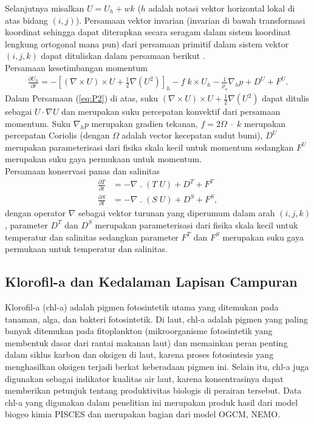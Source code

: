 \begin{spacing}{1.5}
	Selanjutnya misalkan $U = U_h + wk$ ($h$ adalah notasi vektor horizontal lokal di atas bidang $(i,j)$). Persamaan vektor invarian (invarian di bawah transformasi koordinat sehingga dapat diterapkan secara seragam dalam sistem koordinat lengkung ortogonal mana pun) dari persamaan primitif dalam sistem vektor $(i, j, k)$ dapat dituliskan dalam persamaan berikut .\\
	Persamaan kesetimbangan momentum
	\begin{equation}\label{eq:P2}
		\begin{aligned}
			\frac{\partial U_h}{\partial t} = - \left[(\nabla \times U) \times U + \frac{1}{2}\nabla (U^2)\right]_h - f \; k \times U_h - \frac{1}{\rho_o}\nabla_h p + D^U + F^U.
		\end{aligned}
	\end{equation}
	Dalam Persamaan (\ref{eq:P2}) di atas, suku $(\nabla \times U) \times U + \frac{1}{2}\nabla (U^2)$ dapat ditulis sebagai $U\cdot \nabla U$ dan merupakan suku percepatan konvektif dari persamaan momentum. Suku $\nabla_h p$ merupakan gradien tekanan, $f = 2\Omega\; \cdot \;k$ merupakan percepatan Coriolis (dengan $\Omega$ adalah vector kecepatan sudut bumi), $D^U$ merupakan parameterisasi dari fisika skala kecil untuk momentum sedangkan $F^U$ merupakan suku gaya permukaan untuk momentum.\\
	Persamaan konservasi panas dan salinitas
	\begin{equation}\label{eq:P3}
		\begin{aligned}
			\frac{\partial T}{\partial t} &= - \nabla \; . \; (T\;U)  + D^T + F^T \\
			\frac{\partial S}{\partial t} &= - \nabla \; . \; (S\;U)  + D^S + F^S,
		\end{aligned}
	\end{equation}
	dengan operator $\nabla$ sebagai vektor turunan yang diperumum dalam arah $(i,j,k)$, parameter $D^T$ dan $D^S$ merupakan parameterisasi dari fisika skala kecil untuk temperatur dan salinitas sedangkan parameter $F^T$ dan $F^S$ merupakan suku gaya permukaan untuk temperatur dan salinitas. 
	
	\subsection[Klorofil-a dan Kedalaman Lapisan Campuran]{Klorofil-a dan Kedalaman Lapisan Campuran}
	Klorofil-a (chl-a) adalah pigmen fotosintetik utama yang ditemukan pada tanaman, alga, dan bakteri fotosintetik. Di laut, chl-a adalah pigmen yang paling banyak ditemukan pada fitoplankton (mikroorganisme fotosintetik yang membentuk dasar dari rantai makanan laut) dan memainkan peran penting dalam siklus karbon dan oksigen di laut, karena proses fotosintesis yang menghasilkan oksigen terjadi berkat keberadaan pigmen ini. Selain itu, chl-a juga digunakan sebagai indikator kualitas air laut, karena konsentrasinya dapat memberikan petunjuk tentang produktivitas biologis di perairan tersebut. Data chl-a yang digunakan dalam penelitian ini merupakan produk hasil dari model biogeo kimia PISCES \cite{gmd-8-2465-2015} dan merupakan bagian dari model OGCM, NEMO. 
	

\end{spacing}
